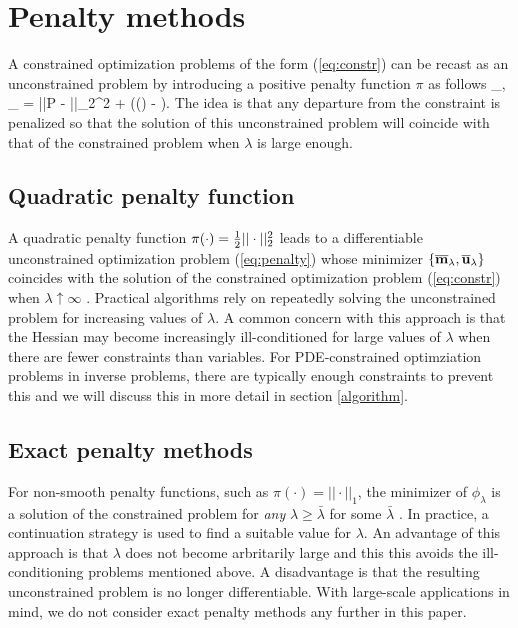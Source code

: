 \documentclass{iopart}
\begin{document}
\section{Penalty methods}
\label{penalty}
A constrained optimization problems of the form (\ref{eq:constr})
can be recast as an unconstrained problem by introducing a positive penalty function $\pi$ as follows
\bq
\label{eq:penalty}
\min_{,} \Phi_{\lambda} = ||P - ||_2^2 + \lambda\pi(() - ).
\eq
The idea is that any departure from the constraint is penalized so that the solution of this 
unconstrained problem will coincide with that of the constrained problem when $\lambda$ is large enough.

\subsection{Quadratic penalty function}
A quadratic penalty function $\pi(\cdot) = {\textstyle\frac{1}{2}}||\cdot||_2^2$ leads to a differentiable 
unconstrained optimization problem (\ref{eq:penalty}) whose minimizer $\{\overline{\mathbf{m}}_{\lambda},\overline{\mathbf{u}}_{\lambda}\}$ coincides with the solution
of the constrained optimization problem (\ref{eq:constr}) when $\lambda \uparrow \infty$ \cite[Thm. 17.1]{Nocedal}. 
Practical algorithms rely on repeatedly solving the unconstrained problem for increasing values of $\lambda$.
A common concern with this approach is that the Hessian may become increasingly ill-conditioned 
for large values of $\lambda$ when there are fewer constraints than variables. For PDE-constrained 
optimziation problems in inverse problems, there are typically enough constraints to prevent this and we will
discuss this in more detail in section \ref{algorithm}.

\subsection{Exact penalty methods}
For non-smooth penalty functions, such as $\pi(\cdot) = ||\cdot||_1$, the minimizer of $\phi_{\lambda}$
is a solution of the constrained problem for \emph{any} $\lambda \geq \bar{\lambda}$ for some $\bar{\lambda}$
\cite[Thm. 17.3]{Nocedal}. In practice, a continuation
strategy is used to find a suitable value for $\lambda$. An advantage of this approach is that $\lambda$ does
not become arbritarily large and this this avoids the ill-conditioning problems mentioned above. A disadvantage
is that the resulting unconstrained problem is no longer differentiable. 
With large-scale applications in mind, we do not consider exact penalty methods any further in this paper.
\end{document}
